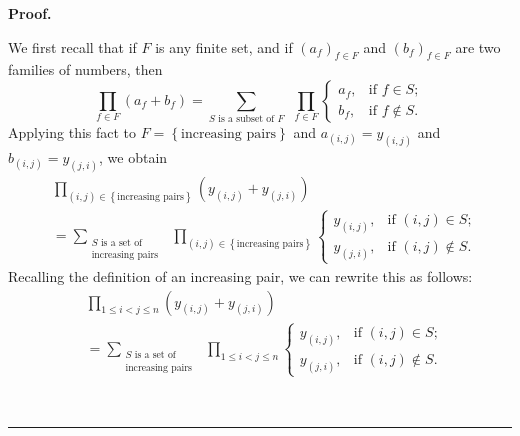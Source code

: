 \documentclass[numbers=enddot,12pt,final,onecolumn,notitlepage]{scrartcl}%
\numberwithin{exer}{subsection}
\theoremstyle{definition}
\newenvironment{fineprint}{\begin{small}}{\end{small}}
\newenvironment{proof}[1][Proof]{\noindent\textbf{#1.} }{\ \rule{0.5em}{0.5em}}
\let\sumnonlimits\sum
\let\prodnonlimits\prod
\renewcommand{\sum}{\sumnonlimits\limits}
\renewcommand{\prod}{\prodnonlimits\limits}
\begin{document}
\begin{proof}
\begin{fineprint}
We first recall that if $F$ is any finite set, and if $\left(  a_{f}\right)
_{f\in F}$ and $\left(  b_{f}\right)  _{f\in F}$ are two families of numbers,
then%
\[
\prod_{f\in F}\left(  a_{f}+b_{f}\right)  =\sum_{S\text{ is a subset of }%
F}\ \ \prod_{f\in F}%
\begin{cases}
a_{f}, & \text{if }f\in S;\\
b_{f}, & \text{if }f\notin S.
\end{cases}
\]
Applying this fact to $F=\left\{  \text{increasing pairs}\right\}  $ and
$a_{\left(  i,j\right)  }=y_{\left(  i,j\right)  }$ and $b_{\left(
i,j\right)  }=y_{\left(  j,i\right)  }$, we obtain%
\begin{align*}
&  \prod_{\left(  i,j\right)  \in\left\{  \text{increasing pairs}\right\}
}\left(  y_{\left(  i,j\right)  }+y_{\left(  j,i\right)  }\right) \\
&  =\sum_{\substack{S\text{ is a set of}\\\text{increasing pairs}}%
}\ \ \prod_{\left(  i,j\right)  \in\left\{  \text{increasing pairs}\right\}  }%
\begin{cases}
y_{\left(  i,j\right)  }, & \text{if }\left(  i,j\right)  \in S;\\
y_{\left(  j,i\right)  }, & \text{if }\left(  i,j\right)  \notin S.
\end{cases}
\end{align*}
Recalling the definition of an increasing pair, we can rewrite this as
follows:%
\begin{align}
&  \prod_{1\leq i<j\leq n}\left(  y_{\left(  i,j\right)  }+y_{\left(
j,i\right)  }\right) \nonumber\\
&  =\sum_{\substack{S\text{ is a set of}\\\text{increasing pairs}}%
}\ \ \prod_{1\leq i<j\leq n}%
\begin{cases}
y_{\left(  i,j\right)  }, & \text{if }\left(  i,j\right)  \in S;\\
y_{\left(  j,i\right)  }, & \text{if }\left(  i,j\right)  \notin S.
\end{cases}
\label{pf.lem.tour1n.prody.3}%
\end{align}



\end{fineprint}
\end{proof}
\end{document}
